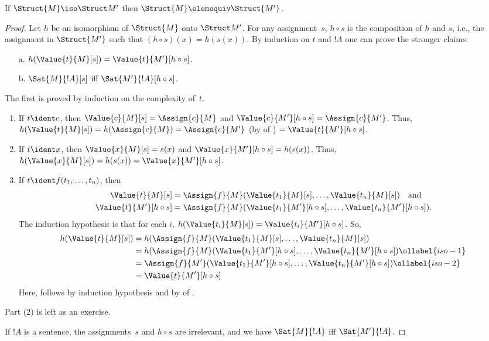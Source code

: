 \documentclass[../../../include/open-logic-section]{subfiles}
\begin{document}
\begin{thm}
If $\Struct{M} \iso \Struct M'$ then $\Struct{M} \elemequiv
\Struct{M'}$.
\end{thm}

\begin{proof}
Let $h$ be an isomorphism of $\Struct{M}$ onto $\Struct M'$. For any
assignment~$s$, $h \circ s$ is the composition of $h$ and $s$, i.e.,
the assignment in $\Struct{M'}$ such that $(h \circ s)(x) = h(s(x))$.
By induction on $t$ and $!A$ one can prove the stronger claims:
\begin{enumerate}
  \item[a.] $h(\Value{t}{M}[s]) = \Value{t}{M'}[h\circ s]$.
  \item[b.] $\Sat{M}{!A}[s]$ iff $\Sat{M'}{!A}[h \circ s]$.
\end{enumerate}
The first is proved by induction on the complexity of~$t$.
\begin{enumerate}
\item If $t \ident c$, then $\Value{c}{M}[s] = \Assign{c}{M}$ and
  $\Value{c}{M'}[h \circ s] = \Assign{c}{M'}$. Thus,
  $h(\Value{t}{M}[s]) = h(\Assign{c}{M}) = \Assign{c}{M'}$ (by
   of ) $=
  \Value{t}{M'}[h \circ s]$.
\item If $t \ident x$, then $\Value{x}{M}[s] = s(x)$ and
  $\Value{x}{M'}[h \circ s] = h(s(x))$. Thus, $h(\Value{x}{M}[s]) =
  h(s(x)) = \Value{x}{M'}[h \circ s]$.
\item If $t \ident f(t_1, \dots, t_n)$, then
  \begin{align*}
    \Value{t}{M}[s] & = \Assign{f}{M}(\Value{t_1}{M}[s], \dots, \Value{t_n}{M}[s]) \quad\text{and}\\
  \Value{t}{M'}[h \circ s] & = \Assign{f}{M}(\Value{t_1}{M'}[h \circ
    s], \dots, \Value{t_n}{M'}[h \circ s]).
  \end{align*}
  The induction hypothesis is that for each $i$, $h(\Value{t_i}{M}[s])
  = \Value{t_i}{M'}[h\circ s]$. So,
  \begin{align}
    h(\Value{t}{M}[s]) 
    & = h(\Assign{f}{M}(\Value{t_1}{M}[s], \dots, \Value{t_n}{M}[s]) \notag\\
    & = h(\Assign{f}{M}(\Value{t_1}{M'}[h \circ s], \dots,
    \Value{t_n}{M'}[h \circ s]) \ollabel{iso-1}\\
    & = \Assign{f}{M'}(\Value{t_1}{M'}[h \circ s], \dots,
    \Value{t_n}{M'}[h \circ s]) \ollabel{iso-2}\\
    & = \Value{t}{M'}[h\circ s] \notag
  \end{align}
  Here,  follows by induction hypothesis and  by
   of .
\end{enumerate}
Part (2) is left as an exercise.

If $!A$ is a sentence, the assignments~$s$ and $h \circ s$ are
irrelevant, and we have $\Sat{M}{!A}$ iff $\Sat{M'}{!A}$.
\end{proof}
\end{document}
